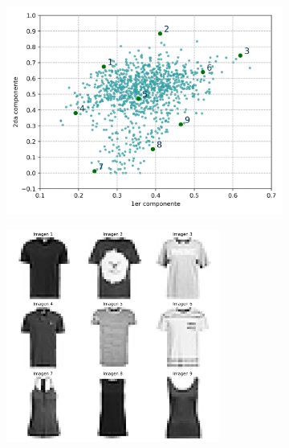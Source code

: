 \begin{figure}[H]
    \centering
    \begin{subfigure}{9.5cm}
        \includegraphics[width=9.5cm]{Graphics/Problema_3_1/loadings_2d.png}
        \caption{}
    \end{subfigure}
    \begin{subfigure}{7cm}
        \includegraphics[width=7cm]{Graphics/Problema_3_1/T_shirts_2d.png}
        \caption{}
    \end{subfigure}
    \caption{}
\end{figure}


